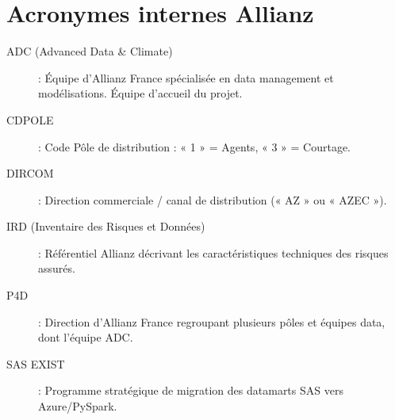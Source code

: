 \section*{Acronymes internes Allianz}

\begin{description}
    \item[ADC (Advanced Data \& Climate)] : Équipe d'Allianz France spécialisée en data management et modélisations. Équipe d'accueil du projet.
    \item[CDPOLE] : Code Pôle de distribution : « 1 » = Agents, « 3 » = Courtage.
    \item[DIRCOM] : Direction commerciale / canal de distribution (« AZ » ou « AZEC »).
    \item[IRD (Inventaire des Risques et Données)] : Référentiel Allianz décrivant les caractéristiques techniques des risques assurés.
    \item[P4D] : Direction d'Allianz France regroupant plusieurs pôles et équipes data, dont l'équipe ADC.
    \item[SAS EXIST] : Programme stratégique de migration des datamarts SAS vers Azure/PySpark.
\end{description}


